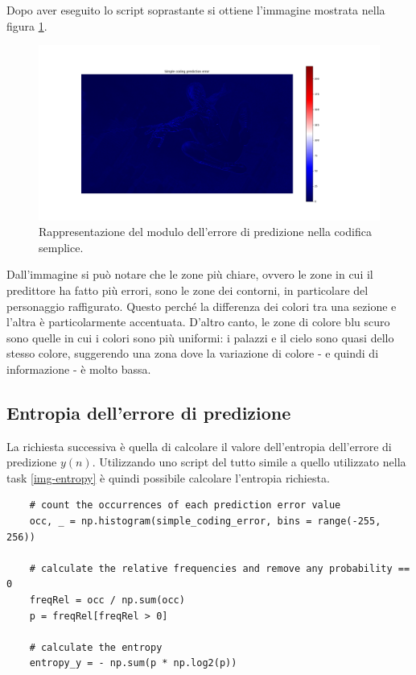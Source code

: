 \noindent Dopo aver eseguito lo script soprastante si ottiene l'immagine mostrata nella figura \ref{fig:simple-coding}.
\begin{figure}[h]
    \centering
    \includegraphics[width = .9\textwidth]{hw-1/report/imgs/simple-coding.png}
    \caption{Rappresentazione del modulo dell'errore di predizione nella codifica semplice.}
    \label{fig:simple-coding}
\end{figure}
Dall'immagine si può notare che le zone più chiare, ovvero le zone in cui il predittore ha fatto più errori, sono le zone dei contorni, in particolare del personaggio raffigurato. Questo perché la differenza dei colori tra una sezione e l'altra è particolarmente accentuata. D'altro canto, le zone di colore blu scuro sono quelle in cui i colori sono più uniformi: i palazzi e il cielo sono quasi dello stesso colore, suggerendo una zona dove la variazione di colore - e quindi di informazione - è molto bassa.



\vspace{15px}\subsection{Entropia dell'errore di predizione}\label{simple-coding-error-entropy}
La richiesta successiva è quella di calcolare il valore dell'entropia dell'errore di predizione $y(n)$. Utilizzando uno script del tutto simile a quello utilizzato nella task \ref{img-entropy} è quindi possibile calcolare l'entropia richiesta.

\begin{lstlisting}
    # count the occurrences of each prediction error value
    occ, _ = np.histogram(simple_coding_error, bins = range(-255, 256))

    # calculate the relative frequencies and remove any probability == 0
    freqRel = occ / np.sum(occ)
    p = freqRel[freqRel > 0]

    # calculate the entropy
    entropy_y = - np.sum(p * np.log2(p))
\end{lstlisting}

